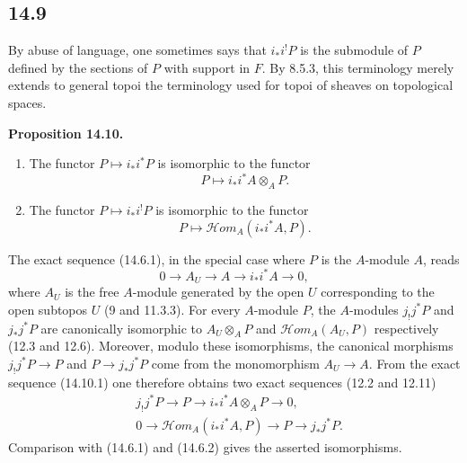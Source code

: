 \documentclass[11pt]{article}
\newcommand{\scrHom}{\mathscr{H}\!om}
\newenvironment{statement}[1]{\par\medskip\noindent\textbf{#1.}\ }{\par\medskip}
\begin{document}
\subsection*{14.9}
By abuse of language, one sometimes says that $i_*i^!P$ is the submodule of $P$ defined by the sections of $P$ with support in $F$. By 8.5.3, this terminology merely extends to general topoi the terminology used for topoi of sheaves on topological spaces.

\begin{statement}{Proposition 14.10}
\begin{enumerate}[label=\arabic*)]
\item The functor $P\mapsto i_*i^*P$ is isomorphic to the functor
\[
P\mapsto i_*i^*A\otimes_A P.
\]
\item The functor $P\mapsto i_*i^!P$ is isomorphic to the functor
\[
P\mapsto \scrHom_A(i_*i^*A,P).
\]
\end{enumerate}
\end{statement}

The exact sequence (14.6.1), in the special case where $P$ is the $A$-module $A$, reads
\begin{equation}
0\longrightarrow A_U\longrightarrow A\longrightarrow i_*i^*A\longrightarrow0,\tag{14.10.1}
\end{equation}
where $A_U$ is the free $A$-module generated by the open $U$ corresponding to the open subtopos $U$ (9 and 11.3.3). For every $A$-module $P$, the $A$-modules $j_!j^*P$ and $j_*j^*P$ are canonically isomorphic to $A_U\otimes_AP$ and $\scrHom_A(A_U,P)$ respectively (12.3 and 12.6). Moreover, modulo these isomorphisms, the canonical morphisms $j_!j^*P\to P$ and $P\to j_*j^*P$ come from the monomorphism $A_U\to A$. From the exact sequence (14.10.1) one therefore obtains two exact sequences (12.2 and 12.11)
\begin{align*}
&j_!j^*P\longrightarrow P\longrightarrow i_*i^*A\otimes_AP\longrightarrow0,\\
&0\longrightarrow \scrHom_A(i_*i^*A,P)\longrightarrow P\longrightarrow j_*j^*P.
\end{align*}
Comparison with (14.6.1) and (14.6.2) gives the asserted isomorphisms.
\end{document}
